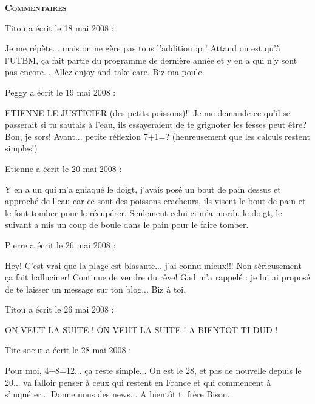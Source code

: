 \bigskip
\textbf{\textsc{Commentaires}}

\medskip
Titou a écrit le 18 mai 2008 :
\begin{displayquote}
Je me répète... mais on ne gère pas tous l'addition :p ! Attand on est qu'à l'UTBM, ça fait partie du programme de dernière année  et y en a qui n'y sont pas encore...
Allez enjoy and take care. Biz ma poule.
\end{displayquote}

\medskip
Peggy a écrit le 19 mai 2008 :
\begin{displayquote}
ETIENNE LE JUSTICIER (des petits poissons)!!
Je me demande ce qu'il se passerait si tu sautais à l'eau, ils essayeraient de te grignoter les fesses peut être?
Bon, je sors!
Avant... petite réflexion 7+1=? (heureusement que les calculs restent simples!)
\end{displayquote}

\medskip
Etienne a écrit le 20 mai 2008 :
\begin{displayquote}
Y en a un qui m'a gniaqué le doigt, j'avais posé un bout de pain dessus et approché de l'eau car ce sont des poissons cracheurs, ils visent le bout de pain et le font tomber pour le récupérer. Seulement celui-ci m'a mordu le doigt, le suivant a mis un coup de boule dans le pain pour le faire tomber.
\end{displayquote}

\medskip
Pierre a écrit le 26 mai 2008 :
\begin{displayquote}
Hey!
C'est vrai que la plage est blasante... j'ai connu mieux!!!
Non sérieusement ça fait halluciner!
Continue de vendre du rêve!
Gad m'a rappelé : je lui ai proposé de te laisser un message sur ton blog...
Biz à toi.
\end{displayquote}

\medskip
Titou a écrit le 26 mai 2008 :
\begin{displayquote}
ON VEUT LA SUITE ! ON VEUT LA SUITE !
A BIENTOT TI DUD !
\end{displayquote}

\medskip
Tite soeur a écrit le 28 mai 2008 :
\begin{displayquote}
Pour moi, 4+8=12... ça reste simple...
On est le 28, et pas de nouvelle depuis le 20... va falloir penser à ceux qui restent en France et qui commencent à s'inquéter...
Donne nous des news...
A bientôt ti frère
Bisou.
\end{displayquote}

\vfill
